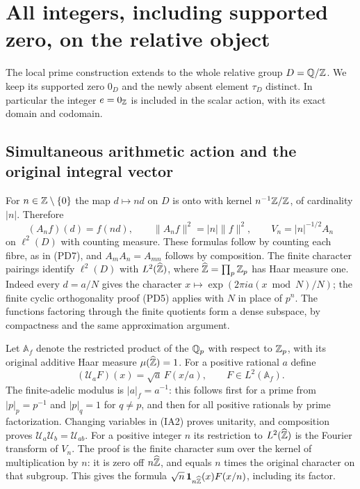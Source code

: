 \section{All integers, including supported zero, on the relative object}
\label{sec:all-integers-relative}
The local prime construction extends to the whole relative group
$D=\mathbb Q/\mathbb Z$. We keep its supported zero $0_D$ and the newly absent
element $\tau_D$ distinct. In particular the integer $e=0_\mathbb Z$ is
included in the scalar action, with its exact domain and codomain.

\subsection{Simultaneous arithmetic action and the original integral vector}
For $n\in\mathbb Z\setminus\{0\}$ the map $d\mapsto nd$ on $D$ is onto
with kernel $n^{-1}\mathbb Z/\mathbb Z$, of cardinality $|n|$. Therefore
\[
 (A_nf)(d)=f(nd),\qquad
 \|A_nf\|^2=|n|\|f\|^2,\qquad
 V_n=|n|^{-1/2}A_n
 \tag{IA1}
\]
on $\ell^2(D)$ with counting measure. These formulas follow by counting
each fibre, as in (PD7), and $A_mA_n=A_{mn}$ follows by composition.
The finite character pairings identify $\ell^2(D)$ with
$L^2(\widehat{\mathbb Z})$, where $\widehat{\mathbb Z}=\prod_p\mathbb Z_p$ has Haar measure
one. Indeed every $d=a/N$ gives the character
$x\mapsto\exp(2\pi i a(x\bmod N)/N)$; the finite cyclic
orthogonality proof (PD5) applies with $N$ in place of $p^n$.
The functions factoring through the finite quotients form a dense
subspace, by compactness and the same approximation argument.

Let $\mathbb A_f$ denote the restricted product of the $\mathbb Q_p$ with
respect to $\mathbb Z_p$, with its original additive Haar measure
$\mu(\widehat{\mathbb Z})=1$. For a positive rational $a$ define
\[
 (\mathcal U_aF)(x)=\sqrt a\,F(x/a),\qquad F\in L^2(\mathbb A_f).
 \tag{IA2}
\]
The finite-adelic modulus is $|a|_f=a^{-1}$: this follows first for
a prime from $|p|_p=p^{-1}$ and $|p|_q=1$ for $q\ne p$, and then
for all positive rationals by prime factorization. Changing variables
in (IA2) proves unitarity, and composition proves
$\mathcal U_a\mathcal U_b=\mathcal U_{ab}$.
For a positive integer $n$ its restriction to $L^2(\widehat{\mathbb Z})$ is
the Fourier transform of $V_n$. The proof is the finite character sum
over the kernel of multiplication by $n$: it is zero off
$n\widehat{\mathbb Z}$, and equals $n$ times the original character on that
subgroup. This gives the formula
$\sqrt n\,\mathbf1_{n\widehat{\mathbb Z}}(x)F(x/n)$, including its factor.

